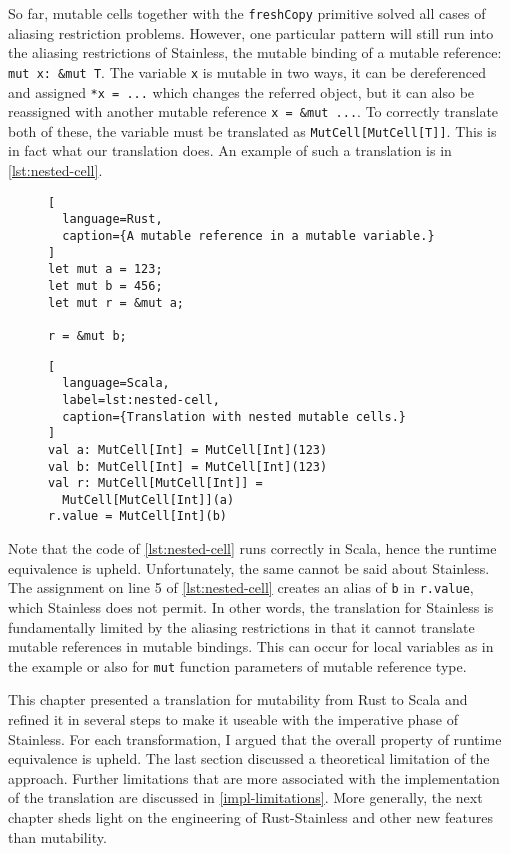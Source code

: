 So far, mutable cells together with the \lstinline!freshCopy! primitive solved
all cases of aliasing restriction problems. However, one particular pattern will
still run into the aliasing restrictions of Stainless, the mutable binding of a
mutable reference: \passthrough{\lstinline!mut x: &mut T!}. The variable
\lstinline!x! is mutable in two ways, it can be dereferenced and assigned
\lstinline!*x = ...! which changes the referred object, but it can also be
reassigned with another mutable reference \lstinline!x = &mut ...!. To correctly
translate both of these, the variable must be translated as
\lstinline!MutCell[MutCell[T]]!. This is in fact what our translation does. An
example of such a translation is in \autoref{lst:nested-cell}.

\begin{figure}
\noindent\begin{minipage}[t]{.35\textwidth}
\begin{lstlisting}[
  language=Rust,
  caption={A mutable reference in a mutable variable.}
]
let mut a = 123;
let mut b = 456;
let mut r = &mut a;

r = &mut b;
\end{lstlisting}
\end{minipage}\hfill
\begin{minipage}[t]{.6\textwidth}
\begin{lstlisting}[
  language=Scala,
  label=lst:nested-cell,
  caption={Translation with nested mutable cells.}
]
val a: MutCell[Int] = MutCell[Int](123)
val b: MutCell[Int] = MutCell[Int](123)
val r: MutCell[MutCell[Int]] =
  MutCell[MutCell[Int]](a)
r.value = MutCell[Int](b)
\end{lstlisting}
\end{minipage}
\end{figure}

Note that the code of \autoref{lst:nested-cell} runs correctly in Scala, hence
the runtime equivalence is upheld. Unfortunately, the same cannot be said about
Stainless. The assignment on line 5 of \autoref{lst:nested-cell} creates an
alias of \lstinline!b! in \lstinline!r.value!, which Stainless does not permit.
In other words, the translation for Stainless is fundamentally limited by the
aliasing restrictions in that it cannot translate mutable references in mutable
bindings. This can occur for local variables as in the example or also for
\lstinline!mut! function parameters of mutable reference type.

\hfill \break \noindent This chapter presented a translation for mutability from
Rust to Scala and refined it in several steps to make it useable with the
imperative phase of Stainless. For each transformation, I argued that the
overall property of runtime equivalence is upheld. The last section discussed a
theoretical limitation of the approach. Further limitations that are more
associated with the implementation  of the translation are discussed in
\autoref{impl-limitations}. More generally, the next chapter sheds light on the
engineering of Rust-Stainless and other new features than mutability.
